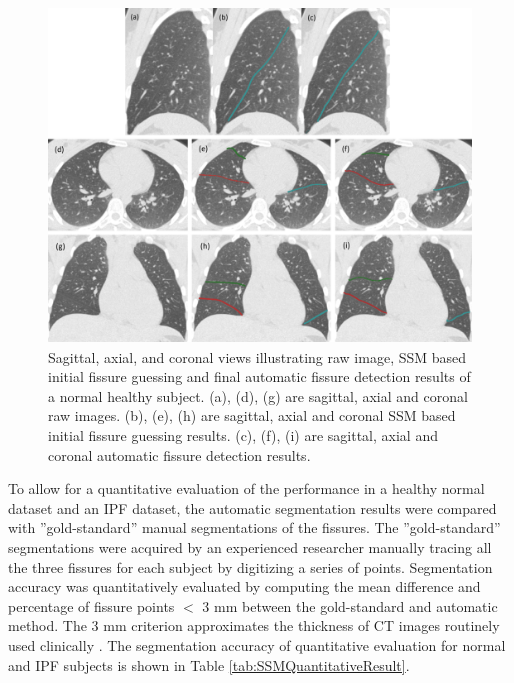 \documentclass[]{spie}  %
\begin{document}
{  %

\begin{figure}[htbp]
  \centering 
  \includegraphics[height=3.5in]{Image/SegmentationResult.png}
  \caption{Sagittal, axial, and coronal views illustrating raw image, SSM based initial fissure guessing and final automatic fissure detection results of a normal healthy subject. (a), (d), (g) are sagittal, axial and coronal raw images. (b), (e), (h) are sagittal, axial and coronal SSM based initial fissure guessing results. (c), (f), (i) are sagittal, axial and coronal automatic fissure detection results.}
  \label{fig:HLASegmentationResults}
\end{figure}

To allow for a quantitative evaluation of the performance in a healthy normal dataset and an IPF dataset, the automatic segmentation results were compared with ''gold-standard'' manual segmentations of the fissures. The ''gold-standard'' segmentations were acquired by an experienced researcher manually tracing all the three fissures for each subject by digitizing a series of points. Segmentation accuracy was quantitatively evaluated by computing the mean difference and percentage of fissure points $<$ 3 mm between the gold-standard and automatic method. The 3 mm criterion approximates the thickness of CT images routinely used clinically \cite{wei2009segmentation}. The segmentation accuracy of quantitative evaluation for normal and IPF subjects is shown in Table \ref{tab:SSMQuantitativeResult}.

}
\end{document}
